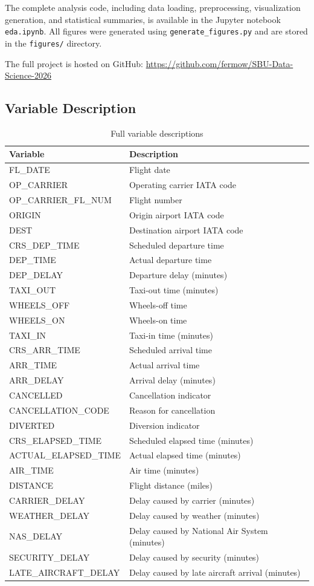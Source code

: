 \documentclass[12pt,a4paper]{article}
\begin{document}
The complete analysis code, including data loading, preprocessing, visualization generation, and statistical summaries, is available in the Jupyter notebook \texttt{eda.ipynb}. All figures were generated using \texttt{generate\_figures.py} and are stored in the \texttt{figures/} directory.

The full project is hosted on GitHub: \url{https://github.com/fermow/SBU-Data-Science-2026}

\subsection{Variable Description}

\begin{table}[H]
\centering
\begin{tabularx}{\textwidth}{l X}
\toprule
\textbf{Variable} & \textbf{Description} \\
\midrule
FL\_DATE & Flight date \\
OP\_CARRIER & Operating carrier IATA code \\
OP\_CARRIER\_FL\_NUM & Flight number \\
ORIGIN & Origin airport IATA code \\
DEST & Destination airport IATA code \\
CRS\_DEP\_TIME & Scheduled departure time \\
DEP\_TIME & Actual departure time \\
DEP\_DELAY & Departure delay (minutes) \\
TAXI\_OUT & Taxi-out time (minutes) \\
WHEELS\_OFF & Wheels-off time \\
WHEELS\_ON & Wheels-on time \\
TAXI\_IN & Taxi-in time (minutes) \\
CRS\_ARR\_TIME & Scheduled arrival time \\
ARR\_TIME & Actual arrival time \\
ARR\_DELAY & Arrival delay (minutes) \\
CANCELLED & Cancellation indicator \\
CANCELLATION\_CODE & Reason for cancellation \\
DIVERTED & Diversion indicator \\
CRS\_ELAPSED\_TIME & Scheduled elapsed time (minutes) \\
ACTUAL\_ELAPSED\_TIME & Actual elapsed time (minutes) \\
AIR\_TIME & Air time (minutes) \\
DISTANCE & Flight distance (miles) \\
CARRIER\_DELAY & Delay caused by carrier (minutes) \\
WEATHER\_DELAY & Delay caused by weather (minutes) \\
NAS\_DELAY & Delay caused by National Air System (minutes) \\
SECURITY\_DELAY & Delay caused by security (minutes) \\
LATE\_AIRCRAFT\_DELAY & Delay caused by late aircraft arrival (minutes) \\
\bottomrule
\end{tabularx}
\caption{Full variable descriptions}
\end{table}
\end{document}
